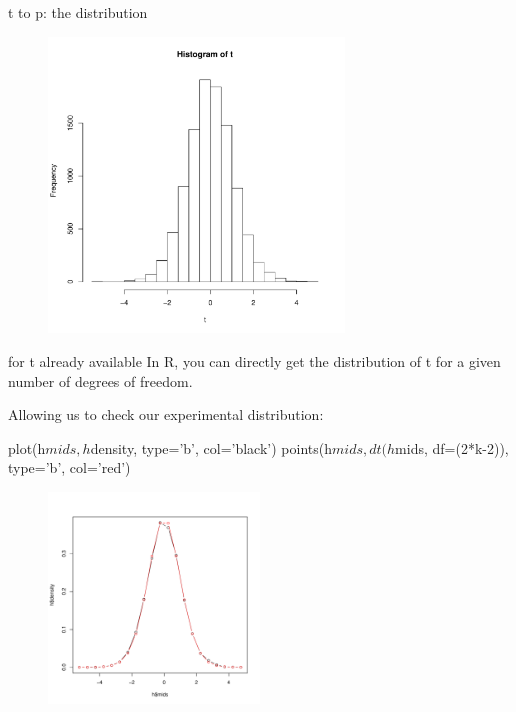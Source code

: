 \documentclass[pdf]{beamer}
\begin{document}
\begin{frame}{t to p: the distribution}
  \begin{figure}[ht]
    \includegraphics[width=0.7\textwidth]{images/tdist1}
  \end{figure}
\end{frame}

\begin{frame}[fragile]{for t already available}
  \small
  In R, you can directly get the distribution of t for a given number of
  degrees of freedom.

  Allowing us to check our experimental distribution:

  \begin{rcode}
    plot(h$mids, h$density, type='b', col='black')
    points(h$mids, dt(h$mids, df=(2*k-2)), type='b', col='red')
  \end{rcode}
  \begin{figure}[ht]
    \includegraphics[width=0.5\textwidth]{images/tdist2}
  \end{figure}
\end{frame}
\end{document}
